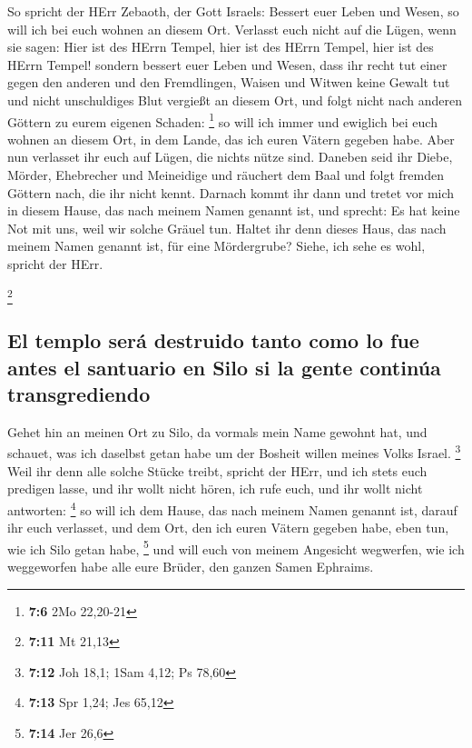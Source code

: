  So spricht der HErr Zebaoth, der Gott Israels: Bessert
euer Leben und Wesen, so will ich bei euch wohnen an diesem Ort.
 Verlasst euch nicht auf die Lügen, wenn sie sagen: Hier
ist des HErrn Tempel, hier ist des HErrn Tempel, hier ist des HErrn
Tempel!  sondern bessert euer Leben und Wesen, dass ihr
recht tut einer gegen den anderen  und den Fremdlingen,
Waisen und Witwen keine Gewalt tut und nicht unschuldiges Blut vergießt
an diesem Ort, und folgt nicht nach anderen Göttern zu eurem eigenen
Schaden: \footnote{\textbf{7:6} 2Mo 22,20-21}  so will ich
immer und ewiglich bei euch wohnen an diesem Ort, in dem Lande, das ich
euren Vätern gegeben habe.  Aber nun verlasset ihr euch
auf Lügen, die nichts nütze sind.  Daneben seid ihr Diebe,
Mörder, Ehebrecher und Meineidige und räuchert dem Baal und folgt
fremden Göttern nach, die ihr nicht kennt.  Darnach kommt
ihr dann und tretet vor mich in diesem Hause, das nach meinem Namen
genannt ist, und sprecht: Es hat keine Not mit uns, weil wir solche
Gräuel tun.  Haltet ihr denn dieses Haus, das nach meinem
Namen genannt ist, für eine Mördergrube? Siehe, ich sehe es wohl,
spricht der HErr.

\footnote{\textbf{7:11} Mt 21,13}

\hypertarget{el-templo-seruxe1-destruido-tanto-como-lo-fue-antes-el-santuario-en-silo-si-la-gente-continuxfaa-transgrediendo}{%
\subsection{El templo será destruido tanto como lo fue antes el
santuario en Silo si la gente continúa
transgrediendo}\label{el-templo-seruxe1-destruido-tanto-como-lo-fue-antes-el-santuario-en-silo-si-la-gente-continuxfaa-transgrediendo}}

 Gehet hin an meinen Ort zu Silo, da vormals mein Name
gewohnt hat, und schauet, was ich daselbst getan habe um der Bosheit
willen meines Volks Israel. \footnote{\textbf{7:12} Joh 18,1; 1Sam 4,12;
  Ps 78,60}  Weil ihr denn alle solche Stücke treibt,
spricht der HErr, und ich stets euch predigen lasse, und ihr wollt nicht
hören, ich rufe euch, und ihr wollt nicht antworten: \footnote{\textbf{7:13}
  Spr 1,24; Jes 65,12}  so will ich dem Hause, das nach
meinem Namen genannt ist, darauf ihr euch verlasset, und dem Ort, den
ich euren Vätern gegeben habe, eben tun, wie ich Silo getan habe,
\footnote{\textbf{7:14} Jer 26,6}  und will euch von
meinem Angesicht wegwerfen, wie ich weggeworfen habe alle eure Brüder,
den ganzen Samen Ephraims.

